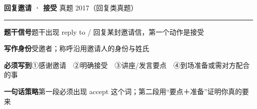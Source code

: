 \documentclass[11pt,a4paper]{ctexart}
\begin{document}
\clearpage
{}\label{g02}
\noindent{\color{accent}\rule{\linewidth}{1.5pt}}\par\vspace{3pt}
\hspace{6pt}
{\LARGE\bfseries 回复邀请 · 接受}\hfill
{\footnotesize\color{gray} 真题 2017（回复类真题）}\par
\vspace{1pt}
{\color{accent!35}\rule{\linewidth}{0.5pt}}\par\vspace{3pt}
{\footnotesize {\color{accent}\bfseries 题干信号}\quad 题干出现 reply to / 回复某封邀请信，第一个动作是接受}\par
{\footnotesize {\color{accent}\bfseries 写作身份}\quad 受邀者；称呼沿用邀请人的身份与姓氏}\par
{\footnotesize {\color{accent}\bfseries 必须写到}\quad ①感谢邀请　②明确接受　③讲座/发言要点　④到场准备或需对方配合的事}\par
{\footnotesize {\color{accent}\bfseries 一句话策略}\quad 第一段必须出现 accept 这个词；第二段用“要点＋准备”证明你真的要来}\par
\end{document}
